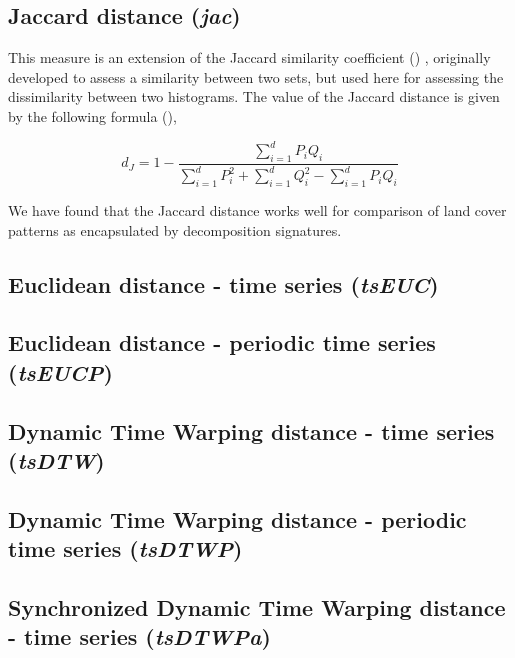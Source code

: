 
\subsection{Jaccard distance ({\it jac})}

This measure is an extension of the Jaccard similarity coefficient (\cite{Jaccard1908})
, originally developed to assess a similarity between two sets, but used here for assessing the dissimilarity between two histograms. 
The value of the Jaccard distance is given by the following formula (\cite{Cha2007}),

\begin{equation} \label{eq:Jaccard}
d_J= 1-\dfrac
{\sum\limits_{i=1}^{d} P_i Q_i}
{\sum\limits_{i=1}^{d} P_i^2 + \sum\limits_{i=1}^{d} Q_i^2 - \sum\limits_{i=1}^{d} P_i Q_i}
\end{equation}

\noindent We have found that the Jaccard distance works well for comparison of land cover patterns as encapsulated by decomposition signatures.





\subsection{Euclidean distance - time series ({\it tsEUC})}

\subsection{Euclidean distance - periodic time series ({\it tsEUCP})}

\subsection{Dynamic Time Warping distance - time series ({\it tsDTW})}

\subsection{Dynamic Time Warping distance - periodic time series ({\it tsDTWP})}

\subsection{Synchronized Dynamic Time Warping distance - time series ({\it tsDTWPa})}

\newpage